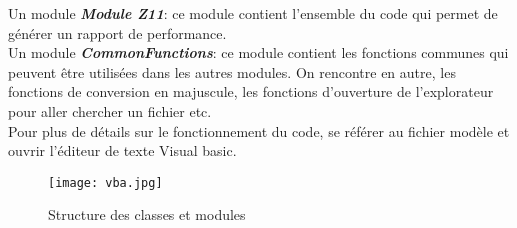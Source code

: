 Un module \textbf{\textit{Module Z11}}: ce module contient l'ensemble du code qui permet de générer un rapport de performance.\\
Un module \textbf{\textit{CommonFunctions}}: ce module contient les fonctions communes qui peuvent être utilisées dans les autres modules. On rencontre en autre, les fonctions de conversion en majuscule, les fonctions d'ouverture de l'explorateur pour aller chercher un fichier etc.\\
Pour plus de détails sur le fonctionnement du code, se référer au fichier modèle et ouvrir l'éditeur de texte Visual basic.\\
\begin{figure}[h]
\centering
\texttt{[image: vba.jpg]}
\caption{\label{struc}Structure des classes et modules}
\end{figure}
\clearpage
